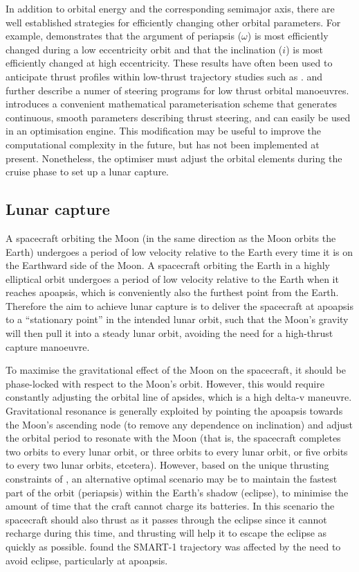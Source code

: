 In addition to orbital energy and the corresponding semimajor axis, there are well established strategies for efficiently changing other orbital parameters. For example, \textcite{Edelbaum1964} demonstrates that the argument of periapsis ($\omega$) is most efficiently changed during a low eccentricity orbit and that the inclination ($i$) is most efficiently changed at high eccentricity. These results have often been used to anticipate thrust profiles within low-thrust trajectory studies such as \textcite{Dachwald2007}. 
\textcite{Pollard2000} and \textcite{Herbiniere2000} further describe a numer of steering programs for low thrust orbital manoeuvres. 
\textcite{Gao2008} introduces a convenient mathematical parameterisation scheme that generates continuous, smooth parameters describing thrust steering, and can easily be used in an optimisation engine. This modification may be useful to improve the computational complexity in the future, but has not been implemented at present. Nonetheless, the optimiser must adjust the orbital elements during the cruise phase to set up a lunar capture.


\subsection{Lunar capture} \label{sub:Capture}

A spacecraft orbiting the Moon (in the same direction as the Moon orbits the Earth) undergoes a period of low velocity relative to the Earth every time it is on the Earthward side of the Moon. A spacecraft orbiting the Earth in a highly elliptical orbit undergoes a period of low velocity relative to the Earth when it reaches apoapsis, which is conveniently also the furthest point from the Earth. Therefore the aim to achieve lunar capture is to deliver the spacecraft at apoapsis to a \enquote{stationary point} in the intended lunar orbit, such that the Moon's gravity will then pull it into a steady lunar orbit, avoiding the need for a high-thrust capture manoeuvre.

To maximise the gravitational effect of the Moon on the spacecraft, it should be phase-locked with respect to the Moon's orbit. However, this would require constantly adjusting the orbital line of apsides, which is a high delta-v maneuvre. Gravitational resonance is generally exploited by pointing the apoapsis towards the Moon's ascending node (to remove any dependence on inclination) and adjust the orbital period to resonate with the Moon (that is, the spacecraft completes two orbits to every lunar orbit, or three orbits to every lunar orbit, or five orbits to every two lunar orbits, etcetera). However, based on the unique thrusting constraints of \BW, an alternative optimal scenario may be to maintain the fastest part of the orbit (periapsis) within the Earth's shadow (eclipse), to minimise the amount of time that the craft cannot charge its batteries. In this scenario the spacecraft should also thrust as it passes through the eclipse since it cannot recharge during this time, and thrusting will help it to escape the eclipse as quickly as possible. \textcite{Racca9} found the SMART-1 trajectory was affected by the need to avoid eclipse, particularly at apoapsis.

